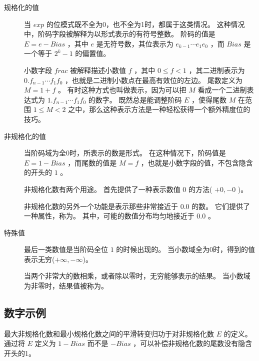 {{        \begin{description}
            \item[规格化的值]
            {
                当 $exp$ 的位模式既不全为0，也不全为1时，都属于这类情况。
                这种情况中，阶码字段被解释为以形式表示的有符号整数。
                阶码的值是 $E = e - Bias$ ，其中 $e$ 是无符号数，其位表示为 $e_{k - 1}\cdots e_1e_0$ ，而 $Bias$ 是一个等于 $2^k - 1$ 的偏置值。

                小数字段 $frac$ 被解释描述小数值 $f$ ，其中 $0 \leq f < 1$ ，其二进制表示为 $0.f_{n - 1}\cdots f_1f_0$ ，也就是二进制小数点在最高有效位的左边。
                尾数定义为 $M = 1 + f$ 。
                有时这种方式也叫做表示，因为可以把 $M$ 看成一个二进制表达式为 $1.f_{n - 1}\cdots f_1f_0$ 的数字。
                既然总是能调整阶码 $E$ ，使得尾数 $M$ 在范围 $1 \leq M < 2$ 之中，那么这种表示方法是一种轻松获得一个额外精度位的技巧。
            }
            \item[非规格化的值]
            {
                当阶码域为全0时，所表示的数是形式。
                在这种情况下，阶码值是 $E = 1 - Bias$ ，而尾数的值是 $M = f$ ，也就是小数字段的值，不包含隐含的开头的 $1$ 。

                非规格化数有两个用途。
                首先提供了一种表示数值 $0$ 的方法( $+0, -0$ )。

                非规格化数的另外一个功能是表示那些非常接近于 $0.0$ 的数。
                它们提供了一种属性，称为。
                其中，可能的数值分布均匀地接近于 $0.0$ 。
            }
            \item[特殊值]
            {
                最后一类数值是当阶码全位 $1$ 的时候出现的。
                当小数域全为0时，得到的值表示无穷($+\infty, -\infty$)。

                当两个非常大的数相乘，或者除以零时，无穷能够表示的结果。
                当小数域为非零时，结果值被称为。
            }
        \end{description}
    }

    \subsection{数字示例}
    {
        最大非规格化数和最小规格化数之间的平滑转变归功于对非规格化数 $E$ 的定义。
        通过将 $E$ 定义为 $1 - Bias$ 而不是 $-Bias$ ，可以补偿非规格化数的尾数没有隐含开头的1。

}}
